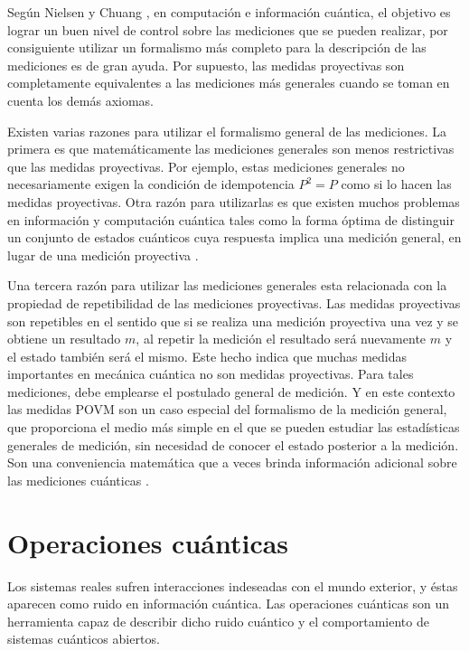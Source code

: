 Según Nielsen y Chuang {\cite{nielsen_chuang_2010}}, en computación e información cuántica, el objetivo es lograr un buen nivel de control sobre las mediciones que se pueden realizar, por consiguiente utilizar un formalismo más completo para la descripción de las mediciones es de gran ayuda. Por supuesto, las medidas proyectivas son completamente equivalentes a las mediciones más generales cuando se toman en cuenta los demás axiomas.


Existen varias razones para utilizar el formalismo general de las mediciones. La primera es que matemáticamente las mediciones generales son menos restrictivas que las medidas proyectivas. Por ejemplo, estas mediciones generales no necesariamente exigen la condición de idempotencia $P^2=P$ como si lo hacen las medidas proyectivas. Otra razón para utilizarlas es que existen muchos problemas en información y computación cuántica tales como la forma óptima de distinguir un conjunto de estados cuánticos cuya respuesta implica una medición general, en lugar de una medición proyectiva {\cite{nielsen_chuang_2010}}.


Una tercera razón para utilizar las mediciones generales esta relacionada con la propiedad de repetibilidad de las mediciones proyectivas. Las medidas proyectivas son repetibles en el sentido que si se realiza una medición proyectiva una vez y se obtiene un resultado $m$, al repetir la medición el resultado será nuevamente $m$ y el estado también será el mismo. Este hecho indica que muchas medidas importantes en mecánica cuántica no son medidas proyectivas.  Para tales mediciones, debe emplearse el postulado general de medición. Y en este contexto las medidas POVM son un caso especial del formalismo de la medición general, que proporciona el medio más simple en el que se pueden estudiar las estadísticas generales de medición, sin necesidad de conocer el estado posterior a la medición. Son una conveniencia matemática que a veces brinda información adicional sobre las mediciones cuánticas {\cite{nielsen_chuang_2010}}.


\section{Operaciones cuánticas}\label{sec:Cap1:OpCuanticas} %

Los sistemas reales sufren interacciones indeseadas con el mundo exterior, y
éstas aparecen como ruido en información cuántica. Las operaciones cuánticas
son un herramienta capaz de describir dicho ruido cuántico y el comportamiento
de sistemas cuánticos abiertos.  %

